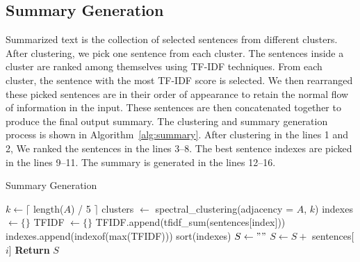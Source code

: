 \subsection{Summary Generation}\label{subsec:summary-generation}
Summarized text is the collection of selected sentences from different clusters.
After clustering, we pick one sentence from each cluster.
The sentences inside a cluster are ranked among themselves using TF-IDF techniques.
From each cluster, the sentence with the most TF-IDF score is selected.
We then rearranged these picked sentences are in their order of appearance to retain the normal flow of
information in the input.
These sentences are then concatenated together to produce the final output summary.
The clustering and summary generation process is shown in Algorithm~\ref{alg:summary}.
After clustering in the lines 1 and 2, We ranked the sentences in the lines 3--8.
The best sentence indexes are picked in the lines 9--11.
The summary is generated in the lines 12--16.

\begin{algorithm} \caption{Summary Generation} \label{alg:summary}
\begin{algorithmic}[1]
    \State $k \gets \lceil$ length($A$) / 5 $\rceil$
    \State clusters $\gets$ spectral\_clustering(adjacency = $A$, $k$)
    \State indexes $\gets \{\}$
        \State TFIDF $\gets \{\}$
            \State TFIDF.append(tfidf\_sum(sentences[index]))
        \EndFor
        \State indexes.append(indexof(max(TFIDF)))
    \EndFor
    \State sort(indexes)
    \State $S \gets ""$
        \State $S \gets S +$ sentences[$i$]
    \EndFor
    \State \textbf{Return} $S$
\end{algorithmic}
\end{algorithm}

